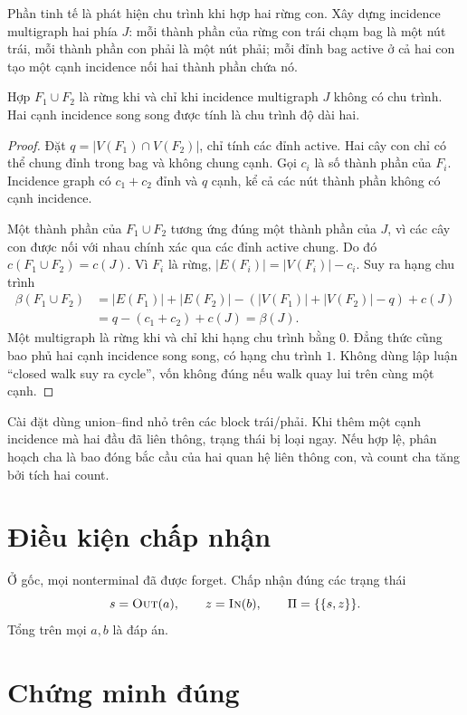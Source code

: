 Phần tinh tế là phát hiện chu trình khi hợp hai rừng con. Xây dựng incidence multigraph hai phía $J$: mỗi thành phần của rừng con trái chạm bag là một nút trái, mỗi thành phần con phải là một nút phải; mỗi đỉnh bag active ở cả hai con tạo một cạnh incidence nối hai thành phần chứa nó.

\begin{lemma}
Hợp $F_1\cup F_2$ là rừng khi và chỉ khi incidence multigraph $J$ không có chu trình. Hai cạnh incidence song song được tính là chu trình độ dài hai.
\end{lemma}

\begin{proof}
Đặt $q=|V(F_1)\cap V(F_2)|$, chỉ tính các đỉnh active. Hai cây con chỉ có thể chung đỉnh trong bag và không chung cạnh. Gọi $c_i$ là số thành phần của $F_i$. Incidence graph có $c_1+c_2$ đỉnh và $q$ cạnh, kể cả các nút thành phần không có cạnh incidence.

Một thành phần của $F_1\cup F_2$ tương ứng đúng một thành phần của $J$, vì các cây con được nối với nhau chính xác qua các đỉnh active chung. Do đó $c(F_1\cup F_2)=c(J)$. Vì $F_i$ là rừng, $|E(F_i)|=|V(F_i)|-c_i$. Suy ra hạng chu trình
\[
\begin{aligned}
\beta(F_1\cup F_2)
&=|E(F_1)|+|E(F_2)|-(|V(F_1)|+|V(F_2)|-q)+c(J)\\
&=q-(c_1+c_2)+c(J)=\beta(J).
\end{aligned}
\]
Một multigraph là rừng khi và chỉ khi hạng chu trình bằng $0$. Đẳng thức cũng bao phủ hai cạnh incidence song song, có hạng chu trình $1$. Không dùng lập luận ``closed walk suy ra cycle'', vốn không đúng nếu walk quay lui trên cùng một cạnh.
\end{proof}

Cài đặt dùng union--find nhỏ trên các block trái/phải. Khi thêm một cạnh incidence mà hai đầu đã liên thông, trạng thái bị loại ngay. Nếu hợp lệ, phân hoạch cha là bao đóng bắc cầu của hai quan hệ liên thông con, và count cha tăng bởi tích hai count.

\section{Điều kiện chấp nhận}

Ở gốc, mọi nonterminal đã được forget. Chấp nhận đúng các trạng thái
\[
  s=\textsc{Out}(a),\qquad z=\textsc{In}(b),\qquad \Pi=\{\{s,z\}\}.
\]
Tổng trên mọi $a,b$ là đáp án.

\section{Chứng minh đúng}

